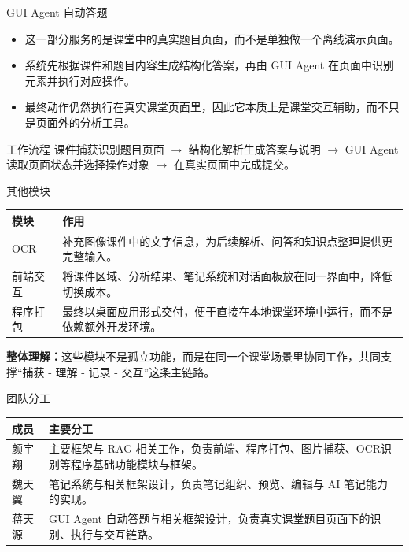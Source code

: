 \documentclass[11pt,aspectratio=169]{ctexbeamer}
\begin{document}
\begin{frame}[t]{GUI Agent 自动答题}
\normalsize
\begin{itemize}
\item 这一部分服务的是课堂中的真实题目页面，而不是单独做一个离线演示页面。
\item 系统先根据课件和题目内容生成结构化答案，再由 GUI Agent 在页面中识别元素并执行对应操作。
\item 最终动作仍然执行在真实课堂页面里，因此它本质上是课堂交互辅助，而不只是页面外的分析工具。
\end{itemize}
\vspace{0.45em}
\begin{block}{工作流程}
课件捕获识别题目页面 $\rightarrow$ 结构化解析生成答案与说明 $\rightarrow$ GUI Agent 读取页面状态并选择操作对象 $\rightarrow$ 在真实页面中完成提交。
\end{block}
\end{frame}

\begin{frame}[t]{其他模块}
\small
\begin{tabularx}{\textwidth}{L{1.75cm} Y}
\toprule
模块 & 作用 \\
\midrule
OCR & 补充图像课件中的文字信息，为后续解析、问答和知识点整理提供更完整输入。 \\
前端交互 & 将课件区域、分析结果、笔记系统和对话面板放在同一界面中，降低切换成本。 \\
程序打包 & 最终以桌面应用形式交付，便于直接在本地课堂环境中运行，而不是依赖额外开发环境。 \\
\bottomrule
\end{tabularx}
\vspace{0.55em}
\normalsize
\textbf{整体理解：}这些模块不是孤立功能，而是在同一个课堂场景里协同工作，共同支撑“捕获 - 理解 - 记录 - 交互”这条主链路。
\end{frame}

\begin{frame}[t]{团队分工}
\small
\begin{tabularx}{\textwidth}{L{1.8cm} Y}
\toprule
成员 & 主要分工 \\
\midrule
颜宇翔 & 主要框架与 RAG 相关工作，负责前端、程序打包、图片捕获、OCR识别等程序基础功能模块与框架。 \\
魏天翼 & 笔记系统与相关框架设计，负责笔记组织、预览、编辑与 AI 笔记能力的实现。 \\
蒋天源 & GUI Agent 自动答题与相关框架设计，负责真实课堂题目页面下的识别、执行与交互链路。 \\
\bottomrule
\end{tabularx}
\end{frame}
\end{document}
